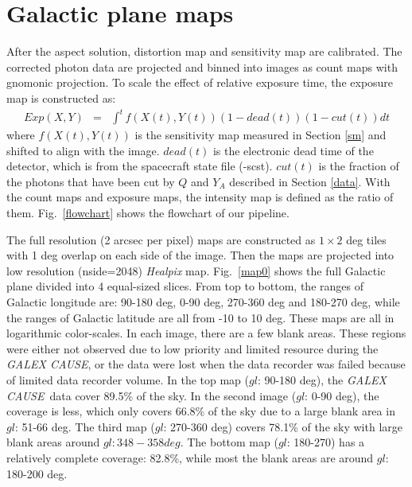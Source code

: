 \documentclass[12pt, preprint]{aastex61}
\newcommand{\project}[1]{\textsl{#1}}
\newcommand{\cause}{\project{GALEX CAUSE}}
\begin{document}
\section{Galactic plane maps}
\label{maps}
After the aspect solution, distortion map and sensitivity map are calibrated.
The corrected photon data are projected and binned into images as count maps with gnomonic projection.
To scale the effect of relative exposure time, the exposure map is constructed as:
\begin{eqnarray}
Exp(X,Y) &=& \int^{t}f(X(t), Y(t))(1-dead(t))(1-cut(t))dt
\end{eqnarray}
where $f(X(t), Y(t))$ is the sensitivity map measured in Section \ref{sm} and shifted to align with the image.
$dead(t)$ is the electronic dead time of the detector, which is from the spacecraft state file (-scst).
$cut(t)$ is the fraction of the photons that have been cut by $Q$ and $Y_A$ described in Section \ref{data}.
With the count maps and exposure maps, the intensity map is defined as the ratio of them.
Fig.~\ref{flowchart} shows the flowchart of our pipeline.

The full resolution (2 arcsec per pixel) maps are constructed as $1 \times 2$ deg tiles with 1 deg overlap on each side of the image.
Then the maps are projected into low resolution (nside=2048) \project{Healpix} map.
Fig.~\ref{map0} shows the full Galactic plane divided into 4 equal-sized slices.
From top to bottom, the ranges of Galactic longitude are: 90-180 deg, 0-90 deg, 270-360 deg and 180-270 deg, while the ranges of Galactic latitude are all from -10 to 10 deg.
These maps are all in logarithmic color-scales. 
In each image, there are a few blank areas.
These regions were either not observed due to low priority and limited resource during the \cause, or the data were lost when the data recorder was failed because of limited data recorder volume.
In the top map ($gl$: 90-180 deg), the \cause\ data cover 89.5\% of the sky.
In the second image ($gl$: 0-90 deg), the coverage is less, which only covers 66.8\% of the sky due to a large blank area in $gl$: 51-66 deg.
The third map ($gl$: 270-360 deg) covers 78.1\% of the sky with large blank areas around $gl: 348-358 deg$.
The bottom map ($gl$: 180-270) has a relatively complete coverage: 82.8\%, while most the blank areas are around $gl$: 180-200 deg.
\end{document}
